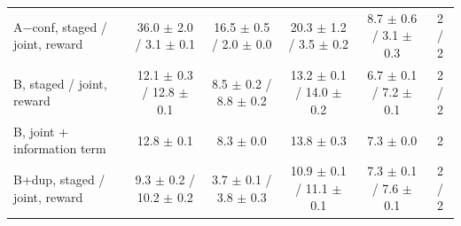 \begin{tabular}{lccccc}
A$-$conf, staged / joint, reward & 36.0 $\pm$ 2.0 / 3.1 $\pm$ 0.1 & 16.5 $\pm$ 0.5 / 2.0 $\pm$ 0.0 & 20.3 $\pm$ 1.2 / 3.5 $\pm$ 0.2 & 8.7 $\pm$ 0.6 / 3.1 $\pm$ 0.3 & 2 / 2 \\
B, staged / joint, reward & 12.1 $\pm$ 0.3 / 12.8 $\pm$ 0.1 & 8.5 $\pm$ 0.2 / 8.8 $\pm$ 0.2 & 13.2 $\pm$ 0.1 / 14.0 $\pm$ 0.2 & 6.7 $\pm$ 0.1 / 7.2 $\pm$ 0.1 & 2 / 2 \\
B, joint + information term & 12.8 $\pm$ 0.1 & 8.3 $\pm$ 0.0 & 13.8 $\pm$ 0.3 & 7.3 $\pm$ 0.0 & 2 \\
B+dup, staged / joint, reward & 9.3 $\pm$ 0.2 / 10.2 $\pm$ 0.2 & 3.7 $\pm$ 0.1 / 3.8 $\pm$ 0.3 & 10.9 $\pm$ 0.1 / 11.1 $\pm$ 0.1 & 7.3 $\pm$ 0.1 / 7.6 $\pm$ 0.1 & 2 / 2 \\
\bottomrule
\end{tabular}